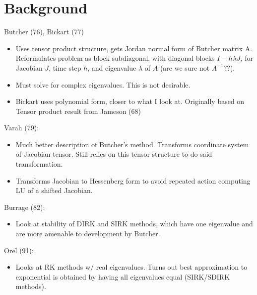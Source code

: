 \documentclass[a4paper,10pt]{article}
\begin{document}
\allowdisplaybreaks


\section{Background}



Butcher (76), Bickart (77)
\begin{itemize}
	\item Uses tensor product structure, gets Jordan normal form of Butcher matrix A. Reformulates
	problem as block subdiagonal, with diagonal blocks $I - h\lambda J$, for Jacobian $J$, time step $h$,
	and eigenvalue $\lambda$ of $A$ (are we sure not $A^{-1}$??).
	\item Must solve for complex eigenvalues. This is not desirable. 
	\item Bickart uses polynomial form, closer to what I look at. Originally based on Tensor product
	result from Jameson (68)
\end{itemize}

Varah (79):
\begin{itemize}
	\item Much better description of Butcher's method. Transforms coordinate system of Jacobian tensor.
	Still relies on this tensor structure to do said transformation. 
	\item Transforms Jacobian to Hessenberg form to avoid repeated action computing LU of a shifted 
	Jacobian.
\end{itemize}

Burrage (82):
\begin{itemize}
	\item Look at stability of DIRK and SIRK methods, which have one eigenvalue and are more amenable
	to development by Butcher. 
\end{itemize}

Orel (91):
\begin{itemize}
	\item Looks at RK methods w/ real eigenvalues. Turns out best approximation to exponential is
	obtained by having all eigenvalues equal (SIRK/SDIRK methods).  
\end{itemize}
\end{document}
